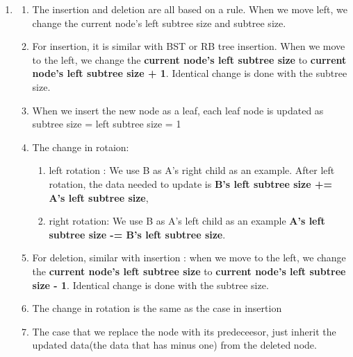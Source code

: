 \documentclass{article}
\begin{document}
\begin{CJK*}{UTF8}{bsmi}
\begin{enumerate}
        
    \item  \begin{enumerate}
        \item The insertion and deletion are all based on a rule. When we move left, we change the current node's left subtree size and subtree size.
        \item For insertion, it is similar with  BST or RB tree insertion. When we move to the left, we change the \textbf{current node's left subtree size} to \textbf{current node's left subtree size + 1}. Identical change is done with the subtree size. 
        \item When we insert the new node as a leaf, each leaf node is updated as subtree size = left subtree size = 1 
        \item The change in rotaion: \begin{enumerate}
            \item left rotation : We use B as A's right child as an example. After left rotation, the data needed to update is \textbf{B's left subtree size += A's left subtree size}, 
            \item right rotation: We use B as A's left child as an example \textbf{A's left subtree size -= B's left subtree size}.
        \end{enumerate}
        \item For deletion, similar with insertion : when we move to the left, we change the \textbf{current node's left subtree size} to \textbf{current node's left subtree size - 1}. Identical change is done with the subtree size. 
        \item The change in rotation is the same as the case in insertion
        \item The case that we replace the node with its predeceesor, just inherit the updated data(the data that has minus one) from the deleted node.
    \end{enumerate}


\end{enumerate}
\end{CJK*}
\end{document}
